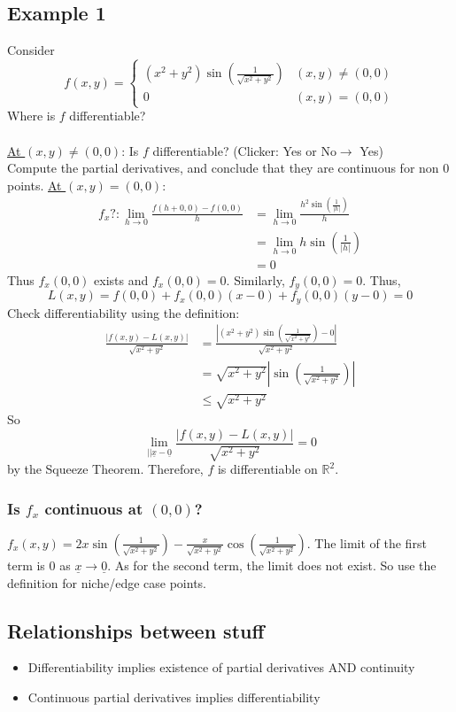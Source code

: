 \documentclass[12pt]{article}
\theoremstyle{definition}
\newcommand{\R}{\mathbb{R}}
\begin{document}
\subsection{Example 1}
Consider \[f(x,y)=\begin{cases}(x^2+y^2)\sin(\frac{1}{\sqrt{x^2+y^2}})&(x,y)\neq(0,0)\\0&(x,y)=(0,0)\end{cases}\]
Where is $f$ differentiable?\\\\
\underline{At $(x,y)\neq (0,0)$}: Is $f$ differentiable? (Clicker: Yes or No$\to$ Yes)\\
Compute the partial derivatives, and conclude that they are continuous for non 0 points.
\underline{At $(x,y)=(0,0)$}:\\
\begin{align*}
    f_x?:\lim_{h\to 0}\frac{f(h+0,0)-f(0,0)}{h}&=\lim_{h\to 0}\frac{h^2\sin(\frac{1}{|h|})}{h}\\
    &=\lim_{h\to 0}h\sin(\frac{1}{|h|})\\
    &=0
\end{align*}
Thus $f_x(0,0)$ exists and $f_x(0,0)=0$. Similarly, $f_y(0,0)=0$. Thus, \[L(x,y)=f(0,0)+f_x(0,0)(x-0)+f_y(0,0)(y-0)=0\]
Check differentiability using the definition:
\begin{align*}
    \frac{|f(x,y)-L(x,y)|}{\sqrt{x^2+y^2}}&=\frac{|(x^2+y^2)\sin(\frac{1}{\sqrt{x^2+y^2}})-0|}{\sqrt{x^2+y^2}}\\
    &=\sqrt{x^2+y^2}|\sin(\frac{1}{\sqrt{x^2+y^2}})|\\
    &\leq \sqrt{x^2+y^2}
\end{align*}
So \[\lim_{||\underline x-\underline 0}\frac{|f(x,y)-L(x,y)|}{\sqrt{x^2+y^2}}=0\] by the Squeeze Theorem. Therefore, $f$ is differentiable on $\R^2$.
\subsubsection{Is $f_x$ continuous at $(0,0)$?}
$f_x(x,y)=2x\sin(\frac{1}{\sqrt{x^2+y^2}})-\frac{x}{\sqrt{x^2+y^2}}\cos(\frac{1}{\sqrt{x^2+y^2}})$. The limit of the first term is 0 as $\underline x\to \underline 0$.
As for the second term, the limit does not exist. So use the definition for niche/edge case points.

\subsection{Relationships between stuff}

\begin{itemize}
    \item Differentiability implies existence of partial derivatives AND continuity
    \item Continuous partial derivatives implies differentiability
\end{itemize}
\end{document}
